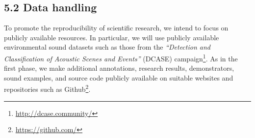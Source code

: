 \documentclass[11pt,a4paper]{article}
\def\PN{\mathrm{ISAD}}
\newcommand{\meinard}[1]{{\color{red} #1}}
\newcommand{\jakob}[1]{{\color{magenta} #1}}
\theoremstyle{plain} \newtheorem{define}{Definition}[section]
\begin{document}
{\subsection*{5.2 Data handling}
%
\vspace{-0.4cm}
To promote the reproducibility of scientific research, we intend to focus on publicly available resources. In particular, we will use publicly available environmental sound datasets such as those from the \emph{``Detection and Classification of Acoustic Scenes and Events''} (DCASE) campaign\footnote{\url{http://dcase.community/}}.
%
As in the first phase, we make additional annotations, research results, demonstrators, sound examples, and source code publicly available on suitable websites and repositories such as Github\footnote{\url{https://github.com/}}.
\vspace{-0.4cm}
%
%
%

}
\end{document}
